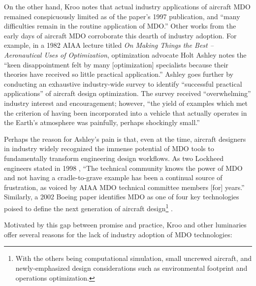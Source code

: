\documentclass[12pt,vi,oneside]{report}
\begin{document}
    On the other hand, Kroo notes that actual industry applications of aircraft MDO remained conspicuously limited as of the paper's 1997 publication, and ``many difficulties remain in the routine application of MDO.'' \cite{kroo_multidisciplinary_1997} Other works from the early days of aircraft MDO corroborate this dearth of industry adoption. For example, in a 1982 AIAA lecture titled \textit{On Making Things the Best -- Aeronautical Uses of Optimization}, optimization advocate Holt Ashley notes the ``keen disappointment felt by many [optimization] specialists because their theories have received so little practical application.'' \cite{ashley_making_1982} Ashley goes further by conducting an exhaustive industry-wide survey to identify ``successful practical applications'' of aircraft design optimization. The survey received ``overwhelming'' industry interest and encouragement; however, ``the yield of examples which met the criterion of having been incorporated into a vehicle that actually operates in the Earth's atmosphere was painfully, perhaps shockingly small.''

    Perhaps the reason for Ashley's pain is that, even at the time, aircraft designers in industry widely recognized the immense potential of MDO tools to fundamentally transform engineering design workflows. As two Lockheed engineers stated in 1998 \cite{radovcich_f22_1998}, ``The technical community knows the power of MDO and not having a cradle-to-grave example has been a continual source of frustration, as voiced by AIAA MDO technical committee members [for] years.'' Similarly, a 2002 Boeing paper identifies MDO as one of four key technologies poised to define the next generation of aircraft design\footnote{With the others being computational simulation, small uncrewed aircraft, and newly-emphasized design considerations such as environmental footprint and operations optimization.} \cite{mcmasters_airplane_2002}.

    Motivated by this gap between promise and practice, Kroo and other luminaries offer several reasons for the lack of industry adoption of MDO technologies:
\end{document}
